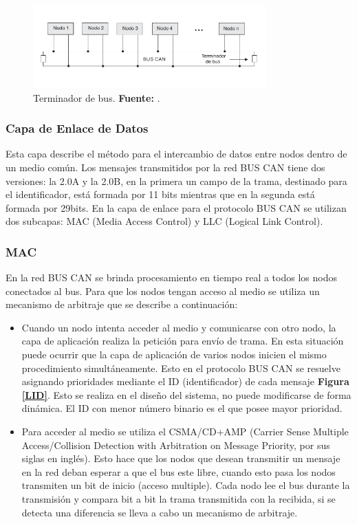\begin{figure}[H]
	\centering
		\includegraphics[width=0.8\textwidth]{./Cap2imagen/terminador.pdf}
	\caption[Terminador de bus.]{Terminador de bus.\textbf{ Fuente:} \cite{PSMR}.}
	\label{T_B} %
\end{figure}


\subsubsection {Capa de Enlace de Datos}
Esta capa describe el método para el intercambio de datos entre nodos dentro de un medio común.
Los mensajes transmitidos por la red BUS CAN tiene dos versiones: la 2.0A y la 2.0B, en la primera un campo de la trama, destinado para el identificador,  está formada por 11 bits mientras que en la segunda está formada por 29bits.
En la capa de enlace para el protocolo BUS CAN se utilizan dos subcapas: MAC (Media Access Control) y LLC (Logical Link Control).

\subsubsection {MAC}

En la red BUS CAN se brinda procesamiento en tiempo real a todos los nodos conectados al bus.  Para que los nodos tengan acceso al medio se utiliza un mecanismo de arbitraje que se describe a continuación:

\begin{itemize}
\item Cuando un nodo intenta acceder al medio y comunicarse con otro nodo, la capa de aplicación realiza la petición para envío de trama. En esta situación puede ocurrir que la capa de aplicación de varios nodos inicien el mismo procedimiento simultáneamente. Esto en el protocolo BUS CAN se resuelve asignando prioridades mediante el ID (identificador) de cada mensaje \textbf{Figura \ref{LID}}. Esto se realiza en el diseño del sistema, no puede modificarse de forma dinámica. El ID con menor número binario es el que posee mayor prioridad.
\item Para acceder al medio se utiliza el CSMA/CD+AMP (Carrier Sense Multiple Access/Collision Detection with Arbitration on Message Priority, por sus siglas en inglés). Esto hace que los nodos que desean transmitir un mensaje en la red deban esperar a que el bus este libre, cuando esto pasa los nodos transmiten un bit de inicio (acceso multiple). Cada nodo lee el bus durante la transmisión y compara bit a bit la trama transmitida con la recibida, si se detecta una diferencia se lleva a cabo un mecanismo de arbitraje.

\end {itemize}

